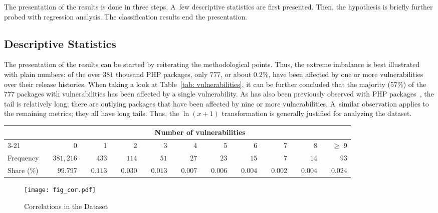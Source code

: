 \documentclass[5p, twocolumn, numbers, sort]{elsarticle}
\begin{document}
The presentation of the results is done in three steps. A~few descriptive
statistics are first presented. Then, the hypothesis is briefly further probed
with regression analysis. The classification results end the presentation.

\subsection{Descriptive Statistics}

The presentation of the results can be started by reiterating the methodological
points. Thus, the extreme imbalance is best illustrated with plain numbers: of
the over $381$ thousand PHP packages, only $777$, or about $0.2\%$, have been
affected by one or more vulnerabilities over their release histories. When
taking a look at Table~\ref{tab: vulnerabilities}, it can be further concluded
that the majority (57\%) of the $777$ packages with vulnerabilities has been
affected by a single vulnerability. As has also been previously observed with
PHP packages~\cite{Ruohonen19EASE}, the tail is relatively long; there are
outlying packages that have been affected by nine or more
vulnerabilities. A~similar observation applies to the remaining metrics; they
all have long tails. Thus, the $\ln(x + 1)$ transformation is generally
justified for analyzing the dataset.

\begin{table*}[th!b]
\centering
\caption{Vulnerabilities Across the PHP Packages}
\label{tab: vulnerabilities}
\begin{tabularx}{\linewidth}{llrcrcrcrcrcrcrcrcrcr}
\toprule
&& \multicolumn{19}{c}{Number of vulnerabilities} \\
\cmidrule{3-21}
&& 0 && 1 && 2 && 3 && 4 && 5 && 6 && 7 && 8 && $\geq$ 9 \\
\hline
Frequency && $381,216$ && $433$ && $114$ && $51$ && $27$ && $23$ && $15$ && $7$ && $14$ && $93$ \\
Share (\%) && $99.797$ && $0.113$ && $0.030$ && $0.013$ && $0.007$ && $0.006$ && $0.004$ && $0.002$ && $0.004$ && $0.024$ \\
\bottomrule
\end{tabularx}
\end{table*}

\begin{figure}[th!b]
\centering
\texttt{[image: fig\_cor.pdf]}
\caption{Correlations in the Dataset}
\label{fig: correlations}
\end{figure}
\end{document}
